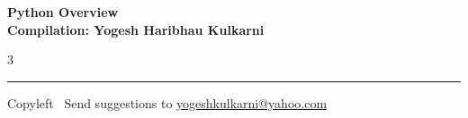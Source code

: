 \documentclass[8pt,landscape]{article}
\begin{document}
\footnotesize


\begin{center}
\Large{\textbf{Python Overview\\ Compilation: Yogesh Haribhau Kulkarni}}
\end{center}

\begin{multicols}{3}

\end{multicols}

\rule{\linewidth}{0.25pt}
\scriptsize
Copyleft \textcopyleft\  Send suggestions to
\href{http://www.yogeshkulkarni.com}{yogeshkulkarni@yahoo.com}
\end{document}
